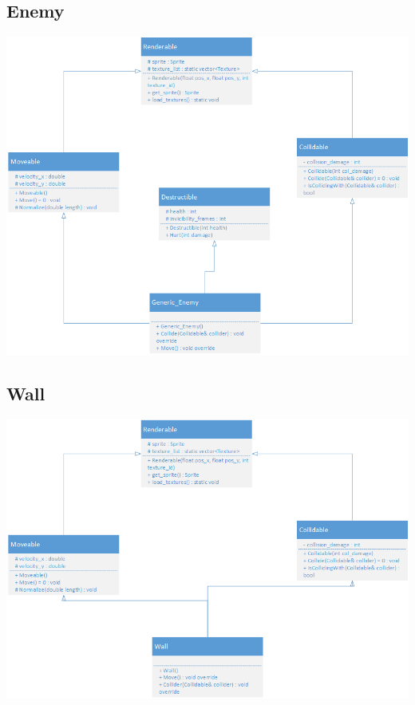 \documentclass{TDP005mall}
\begin{document}
\subsection{Enemy}
\begin{center}
\includegraphics[scale=0.75]{Drawings/enemy.png}
\end{center}
\clearpage

\subsection{Wall}
\begin{center}
\includegraphics[scale=0.75]{Drawings/wall.png}
\end{center}
\clearpage
\end{document}
